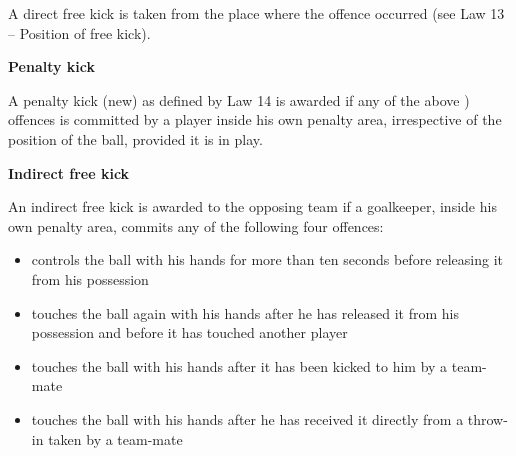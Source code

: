 \bigskip


A direct free kick is taken from the place where the offence occurred (see Law 13 -- Position of free kick). 



\bigskip

{\bfseries Penalty kick}

\headlinebox

A penalty kick (new) as defined by Law 14 is awarded if any of the above 
) offences is committed by a player inside his own penalty area,
irrespective of the position of the ball, provided it is in play.


\bigskip

{\bfseries Indirect free kick}

\headlinebox

An indirect free kick is awarded to the opposing team if a goalkeeper, inside his own penalty area, commits any of the following four offences: 

\begin{itemize}
\item controls the ball with his hands for more than ten seconds before releasing it from his possession
\item touches the ball again with his hands after he has released it from his possession and before it has touched another player
\item touches the ball with his hands after it has been  kicked to him by a team-mate
\item touches the ball with his hands after he has received it directly from a throw-in taken by a team-mate
\end{itemize}

\bigskip


